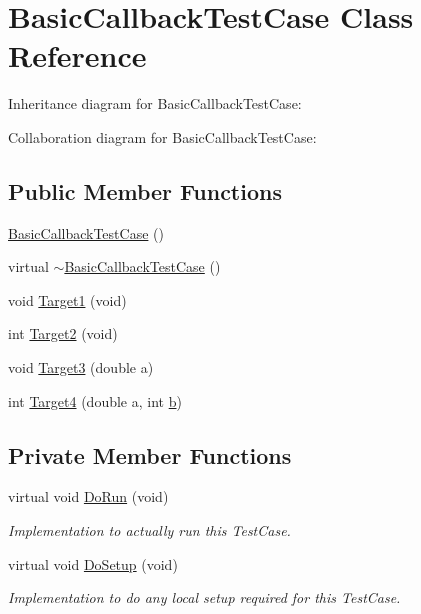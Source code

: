 \hypertarget{classBasicCallbackTestCase}{}\section{Basic\+Callback\+Test\+Case Class Reference}
\label{classBasicCallbackTestCase}


Inheritance diagram for Basic\+Callback\+Test\+Case\+:


Collaboration diagram for Basic\+Callback\+Test\+Case\+:
\subsection*{Public Member Functions}
\begin{DoxyCompactItemize}
\item 
\hyperlink{classBasicCallbackTestCase_a43cb640003cbc81b674cc0ee8d63902d}{Basic\+Callback\+Test\+Case} ()
\item 
virtual \hyperlink{classBasicCallbackTestCase_a977d53bfbe95af94209e13cc8a164bfd}{$\sim$\+Basic\+Callback\+Test\+Case} ()
\item 
void \hyperlink{classBasicCallbackTestCase_a355bda47bacdd87c9db8f521ef11c2f8}{Target1} (void)
\item 
int \hyperlink{classBasicCallbackTestCase_a9bbbcd0919566d5882de93051b82f4b0}{Target2} (void)
\item 
void \hyperlink{classBasicCallbackTestCase_a6316385907068e5282825059758ac973}{Target3} (double a)
\item 
int \hyperlink{classBasicCallbackTestCase_acded6016c8875ee1174068e28b1d464b}{Target4} (double a, int \hyperlink{lte__pathloss_8m_a21ad0bd836b90d08f4cf640b4c298e7c}{b})
\end{DoxyCompactItemize}
\subsection*{Private Member Functions}
\begin{DoxyCompactItemize}
\item 
virtual void \hyperlink{classBasicCallbackTestCase_a49f6eef99e84edf9fd640e790827f430}{Do\+Run} (void)
\begin{DoxyCompactList}\small\item\em Implementation to actually run this Test\+Case. \end{DoxyCompactList}\item 
virtual void \hyperlink{classBasicCallbackTestCase_a5da97d3d61fa85b1486816d7a069a2ea}{Do\+Setup} (void)
\begin{DoxyCompactList}\small\item\em Implementation to do any local setup required for this Test\+Case. \end{DoxyCompactList}\end{DoxyCompactItemize}
